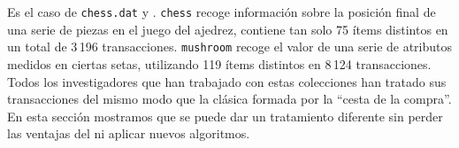 Es el caso de \texttt{chess.dat} y \mushroom.  \texttt{chess} recoge información sobre la posición final de una serie de piezas en el juego del ajedrez, contiene tan solo 75 ítems distintos en un total de 3\,196 transacciones. \texttt{mushroom} recoge el valor de una serie de atributos medidos en ciertas setas, utilizando 119 ítems distintos en 8\,124 transacciones. Todos los investigadores que han trabajado con estas colecciones han tratado sus transacciones del mismo modo que la clásica \transaccion formada por la ``cesta de la compra''. En esta sección mostramos que se puede dar un tratamiento diferente sin perder las ventajas del \ARM ni aplicar nuevos algoritmos.
